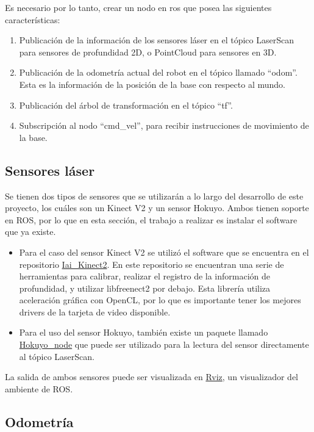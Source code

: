 Es necesario por lo tanto, crear un nodo en ros que posea las siguientes características:

\begin{enumerate}
\item Publicación de la información de los sensores láser en el tópico LaserScan para sensores de profundidad 2D, o PointCloud para sensores en 3D.
\item Publicación de la odometría actual del robot en el tópico llamado ``odom''. Esta es la información de la posición de la base con respecto al mundo.
\item Publicación del árbol de transformación en el tópico ``tf''.
\item Subscripción al nodo ``cmd\_vel'', para recibir instrucciones de movimiento de la base.
\end{enumerate}

\subsection{Sensores láser}

Se tienen dos tipos de sensores que se utilizarán a lo largo del desarrollo de este proyecto, los cuáles son un Kinect V2 y un sensor Hokuyo. Ambos tienen soporte en ROS, por lo que en esta sección, el trabajo a realizar es instalar el software que ya existe.

\begin{itemize}
\item Para el caso del sensor Kinect V2 se utilizó el software que se encuentra en el repositorio \href{https://github.com/code-iai/iai_kinect2}{Iai\_Kinect2}. En este repositorio se encuentran una serie de herramientas para calibrar, realizar el registro de la información de profundidad, y utilizar libfreenect2 por debajo. Esta librería utiliza aceleración gráfica con OpenCL, por lo que es importante tener los mejores drivers de la tarjeta de video disponible.

\item Para el uso del sensor Hokuyo, también existe un paquete llamado \href{https://github.com/ros-drivers/hokuyo_node}{Hokuyo\_node} que puede ser utilizado para la lectura del sensor directamente al tópico LaserScan.
\end{itemize}

La salida de ambos sensores puede ser visualizada en \href{http://wiki.ros.org/rviz}{Rviz}, un visualizador del ambiente de ROS.

\subsection{Odometría}


